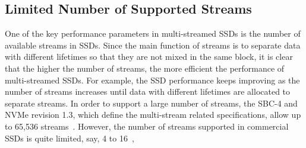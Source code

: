 \subsection{Limited Number of Supported Streams}
One of the key performance parameters in multi-streamed SSDs is the number of 
available streams in SSDs.  
Since the main function of  streams is to separate data with different lifetimes 
so that they are not mixed in the same block, it is clear that the 
higher the number of streams, the more efficient the performance of multi-streamed SSDs.
For example, the SSD performance keeps improving as the number of streams increases 
until data with different lifetimes are allocated to separate streams.   
In order to support a large number of streams, the SBC-4 and NVMe revision 1.3, which define the 
multi-stream related specifications, allow up to 65,536 streams~\cite{T10, NVMe}.  
However, the number of streams supported in
commercial SSDs is quite limited, say, 4 to 16~\cite{MultiStream, Level, AutoStream}, 
